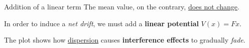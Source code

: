 \begin{frame}{Addition of a linear term}
    The mean value, on the contrary, \underline{does not change}.

    \vfill

    \pause

    In order to induce a \textit{net drift}, we must add a \textbf{linear potential} $V(x)=Fx$.

    \vfill

    \vspace{-0.1cm}


    \vspace{-0.5cm}

    \footnotesize

    \begin{center}
        The plot shows how \underline{dispersion} causes \textbf{interference effects} to gradually \textit{fade}.
    \end{center}

    \normalsize
\end{frame}

